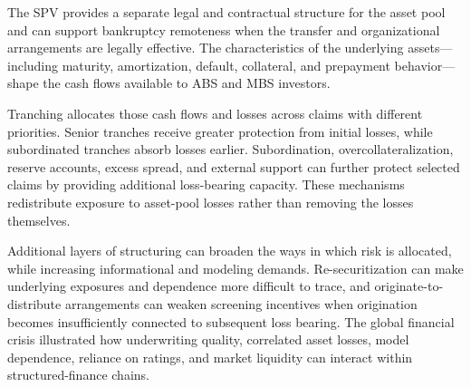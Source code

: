 The SPV provides a separate legal and contractual structure for the asset pool and can support bankruptcy remoteness when the transfer and organizational arrangements are legally effective. The characteristics of the underlying assets---including maturity, amortization, default, collateral, and prepayment behavior---shape the cash flows available to ABS and MBS investors.

Tranching allocates those cash flows and losses across claims with different priorities. Senior tranches receive greater protection from initial losses, while subordinated tranches absorb losses earlier. Subordination, overcollateralization, reserve accounts, excess spread, and external support can further protect selected claims by providing additional loss-bearing capacity. These mechanisms redistribute exposure to asset-pool losses rather than removing the losses themselves.

Additional layers of structuring can broaden the ways in which risk is allocated, while increasing informational and modeling demands. Re-securitization can make underlying exposures and dependence more difficult to trace, and originate-to-distribute arrangements can weaken screening incentives when origination becomes insufficiently connected to subsequent loss bearing. The global financial crisis illustrated how underwriting quality, correlated asset losses, model dependence, reliance on ratings, and market liquidity can interact within structured-finance chains.



